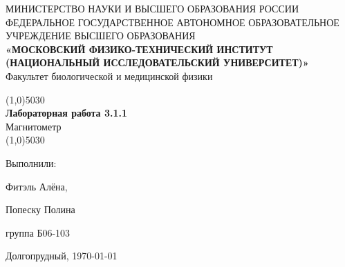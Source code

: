 \documentclass[a4paper,12pt]{article} %
\theoremstyle{plain} %
\theoremstyle{definition} %
\theoremstyle{remark} %
\begin{document}
 
\begin{center}
\hfill \break
{МИНИСТЕРСТВО НАУКИ И ВЫСШЕГО ОБРАЗОВАНИЯ РОССИИ}\\
\footnotesize{ФЕДЕРАЛЬНОЕ ГОСУДАРСТВЕННОЕ АВТОНОМНОЕ ОБРАЗОВАТЕЛЬНОЕ}\\ 
\footnotesize{УЧРЕЖДЕНИЕ ВЫСШЕГО ОБРАЗОВАНИЯ}\\
\small{\textbf{«МОСКОВСКИЙ ФИЗИКО-ТЕХНИЧЕСКИЙ ИНСТИТУТ (НАЦИОНАЛЬНЫЙ ИССЛЕДОВАТЕЛЬСКИЙ УНИВЕРСИТЕТ)»}}\\
\hfill \break
\normalsize{Факультет биологической и медицинской физики}\\
\hfill \break

\hfill \break
\hfill \break
\hfill \break
\hfill\break
\hfill\break
\line(1,0){5030}\\[1mm]
\Large\textbf{{Лабораторная работа 3.1.1}}\\
\Large{Магнитометр}\\
\line(1,0){5030}\\[1mm]
\hfill \break
\hfill \break
\hfill \break
\hfill \break
\hfill \break
\hfill \break
\hfill \break
\end{center}
 
\begin{flushright}
{Выполнили:}

{Фитэль Алёна,}

{Попеску Полина}

{группа Б06-103}
\end{flushright}

\hfill \break
\hfill \break
\hfill \break
\hfill \break
\hfill \break
\hfill \break
\hfill \break
\begin{center} Долгопрудный,  \today \end{center}
\thispagestyle{empty} %

\addto{} 
\addto{} 
\addto{} 
\addto{} 
\addto{} 
\addto{} 
\addto{} 
\addto{} 
\addto{} 
\addto{} 
\addto{}
 
\end{document}
